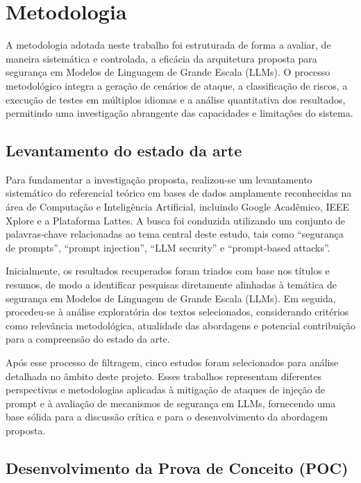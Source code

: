 \section{Metodologia}
\label{sec:methodology}

A metodologia adotada neste trabalho foi estruturada de forma a avaliar, de maneira sistemática e controlada, a eficácia da arquitetura proposta para segurança em Modelos de Linguagem de Grande Escala (LLMs). O processo metodológico integra a geração de cenários de ataque, a classificação de riscos, a execução de testes em múltiplos idiomas e a análise quantitativa dos resultados, permitindo uma investigação abrangente das capacidades e limitações do sistema.

\subsection{Levantamento do estado da arte}

Para fundamentar a investigação proposta, realizou-se um levantamento sistemático do referencial teórico em bases de dados amplamente reconhecidas na área de Computação e Inteligência Artificial, incluindo Google Acadêmico, IEEE Xplore e a Plataforma Lattes. A busca foi conduzida utilizando um conjunto de palavras-chave relacionadas ao tema central deste estudo, tais como “segurança de prompts”, “prompt injection”, “LLM security” e “prompt-based attacks”.

Inicialmente, os resultados recuperados foram triados com base nos títulos e resumos, de modo a identificar pesquisas diretamente alinhadas à temática de segurança em Modelos de Linguagem de Grande Escala (LLMs). Em seguida, procedeu-se à análise exploratória dos textos selecionados, considerando critérios como relevância metodológica, atualidade das abordagens e potencial contribuição para a compreensão do estado da arte.

Após esse processo de filtragem, cinco estudos foram selecionados para análise detalhada no âmbito deste projeto. Esses trabalhos representam diferentes perspectivas e metodologias aplicadas à mitigação de ataques de injeção de prompt e à avaliação de mecanismos de segurança em LLMs, fornecendo uma base sólida para a discussão crítica e para o desenvolvimento da abordagem proposta.

\subsection{Desenvolvimento da Prova de Conceito (POC)}

